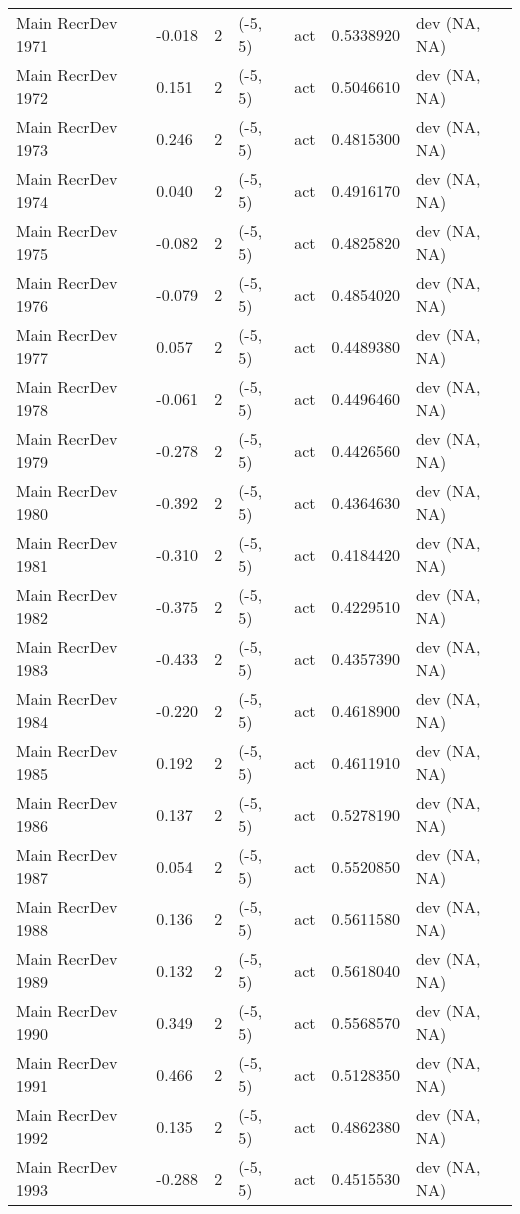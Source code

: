 \documentclass[11pt,
  english,
  letterpaper,
]{article}
\begin{document}
\begin{landscape}
\begin{longtable}[t]{>{\raggedright\arraybackslash}p{7cm}lllll>{\raggedright\arraybackslash}p{4cm}}
Main RecrDev 1971 & -0.018 & 2 & (-5, 5) & act & 0.5338920 & dev (NA, NA)\\
Main RecrDev 1972 & 0.151 & 2 & (-5, 5) & act & 0.5046610 & dev (NA, NA)\\
Main RecrDev 1973 & 0.246 & 2 & (-5, 5) & act & 0.4815300 & dev (NA, NA)\\
Main RecrDev 1974 & 0.040 & 2 & (-5, 5) & act & 0.4916170 & dev (NA, NA)\\
Main RecrDev 1975 & -0.082 & 2 & (-5, 5) & act & 0.4825820 & dev (NA, NA)\\
Main RecrDev 1976 & -0.079 & 2 & (-5, 5) & act & 0.4854020 & dev (NA, NA)\\
Main RecrDev 1977 & 0.057 & 2 & (-5, 5) & act & 0.4489380 & dev (NA, NA)\\
Main RecrDev 1978 & -0.061 & 2 & (-5, 5) & act & 0.4496460 & dev (NA, NA)\\
Main RecrDev 1979 & -0.278 & 2 & (-5, 5) & act & 0.4426560 & dev (NA, NA)\\
Main RecrDev 1980 & -0.392 & 2 & (-5, 5) & act & 0.4364630 & dev (NA, NA)\\
Main RecrDev 1981 & -0.310 & 2 & (-5, 5) & act & 0.4184420 & dev (NA, NA)\\
Main RecrDev 1982 & -0.375 & 2 & (-5, 5) & act & 0.4229510 & dev (NA, NA)\\
Main RecrDev 1983 & -0.433 & 2 & (-5, 5) & act & 0.4357390 & dev (NA, NA)\\
Main RecrDev 1984 & -0.220 & 2 & (-5, 5) & act & 0.4618900 & dev (NA, NA)\\
Main RecrDev 1985 & 0.192 & 2 & (-5, 5) & act & 0.4611910 & dev (NA, NA)\\
Main RecrDev 1986 & 0.137 & 2 & (-5, 5) & act & 0.5278190 & dev (NA, NA)\\
Main RecrDev 1987 & 0.054 & 2 & (-5, 5) & act & 0.5520850 & dev (NA, NA)\\
Main RecrDev 1988 & 0.136 & 2 & (-5, 5) & act & 0.5611580 & dev (NA, NA)\\
Main RecrDev 1989 & 0.132 & 2 & (-5, 5) & act & 0.5618040 & dev (NA, NA)\\
Main RecrDev 1990 & 0.349 & 2 & (-5, 5) & act & 0.5568570 & dev (NA, NA)\\
Main RecrDev 1991 & 0.466 & 2 & (-5, 5) & act & 0.5128350 & dev (NA, NA)\\
Main RecrDev 1992 & 0.135 & 2 & (-5, 5) & act & 0.4862380 & dev (NA, NA)\\
Main RecrDev 1993 & -0.288 & 2 & (-5, 5) & act & 0.4515530 & dev (NA, NA)\\

\end{longtable}
\end{landscape}
\end{document}
